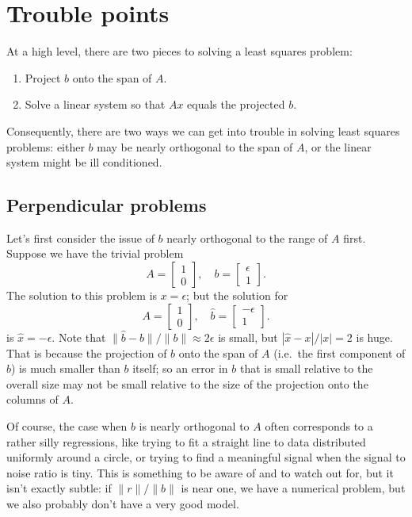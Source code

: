 \documentclass[12pt, leqno]{article} %
\begin{document}


\section{Trouble points}

At a high level, there are two pieces to solving a least squares
problem:
\begin{enumerate}
\item Project $b$ onto the span of $A$.
\item Solve a linear system so that $Ax$ equals the projected $b$.
\end{enumerate}
Consequently, there are two ways we can get into trouble in solving
least squares problems: either $b$ may be nearly orthogonal to the
span of $A$, or the linear system might be ill conditioned.


\subsection{Perpendicular problems}

Let's first consider the issue of $b$ nearly orthogonal to the
range of $A$ first.  Suppose we have the trivial problem
\[
A = \begin{bmatrix} 1 \\ 0 \end{bmatrix}, \quad
b = \begin{bmatrix} \epsilon \\ 1 \end{bmatrix}.
\]
The solution to this problem is $x = \epsilon$; but the solution for
\[
A = \begin{bmatrix} 1 \\ 0 \end{bmatrix}, \quad
\hat b = \begin{bmatrix} -\epsilon \\ 1 \end{bmatrix}.
\]
is $\hat x = -\epsilon$.  Note that $\|\hat b-b\|/\|b\| \approx 2
\epsilon$ is small, but $|\hat x - x|/|x| = 2$ is huge.  That is
because the projection of $b$ onto the span of $A$ (i.e.~the first
component of $b$) is much smaller than $b$ itself; so an error in $b$
that is small relative to the overall size may not be small relative
to the size of the projection onto the columns of $A$.

Of course, the case when $b$ is nearly orthogonal to $A$ often
corresponds to a rather silly regressions, like trying to fit a
straight line to data distributed uniformly around a circle, or trying
to find a meaningful signal when the signal to noise ratio is tiny.
This is something to be aware of and to watch out for, but it isn't
exactly subtle: if $\|r\|/\|b\|$ is near one, we have a numerical
problem, but we also probably don't have a very good model.
\end{document}
